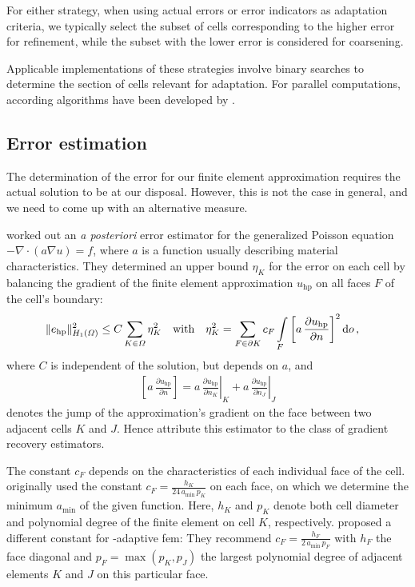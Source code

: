 For either strategy, when using actual errors or error indicators as adaptation criteria, we typically select the subset of cells corresponding to the higher error for refinement, while the subset with the lower error is considered for coarsening.

Applicable implementations of these strategies involve binary searches to determine the section of cells relevant for adaptation. For parallel computations, according algorithms have been developed by \textcites[Sec.~3.1]{burstedde2008}[Sec.~5.1]{bangerth2012}.



\subsection{Error estimation}
\label{ssec:estimation}

The determination of the error for our finite element approximation requires the actual solution to be at our disposal. However, this is not the case in general, and we need to come up with an alternative measure.

\textcite{kelly1983} worked out an \textit{a posteriori} error estimator for the generalized Poisson equation $-\nabla \cdot \left( a \nabla u \right) = f$, where $a$ is a function usually describing material characteristics. They determined an upper bound $\eta_K$ for the error on each cell by balancing the gradient of the finite element approximation $u_\text{hp}$ on all faces $F$ of the cell's boundary:
\begin{align}
\label{eq:kelly} \|e_\text{hp}\|_{H_1(\Omega)}^2 &\leq C \sum\limits_{K \in \Omega} \eta_K^2 &&\text{with}&  \eta_K^2 &= \sum\limits_{F \in \partial K} c_F \int\limits_{F} \left[ a \, \frac{\partial u_\text{hp}}{\partial n} \right]^2 \mathop{}\!\mathrm{d}o \,\text{,}
\end{align}
where $C$ is independent of the solution, but depends on $a$, and
\begin{align*}
\left[ a \, \frac{\partial u_\text{hp}}{\partial n} \right] = \left. a \, \frac{\partial u_\text{hp}}{\partial n_K} \right|_K + \left. a \, \frac{\partial u_\text{hp}}{\partial n_J}\right|_J
\end{align*}
denotes the jump of the approximation's gradient on the face between two adjacent cells $K$ and $J$. Hence \textcite{ainsworth1997a} attribute this estimator to the class of gradient recovery estimators.

The constant $c_F$ depends on the characteristics of each individual face of the cell. \textcite{kelly1983} originally used the constant $c_F = \frac{h_K}{24 \, a_\text{min} \, p_K}$ on each face, on which we determine the minimum $a_\text{min}$ of the given function. Here, $h_K$ and $p_K$ denote both cell diameter and polynomial degree of the finite element on cell $K$, respectively. \textcite{davydov2017} proposed a different constant for \hp-adaptive \gls{fem}: They recommend $c_F = \frac{h_F}{2 \, a_\text{min} \, p_F}$ with $h_F$ the face diagonal and $p_F = \max\left(p_K, p_J\right)$ the largest polynomial degree of adjacent elements $K$ and $J$ on this particular face.

